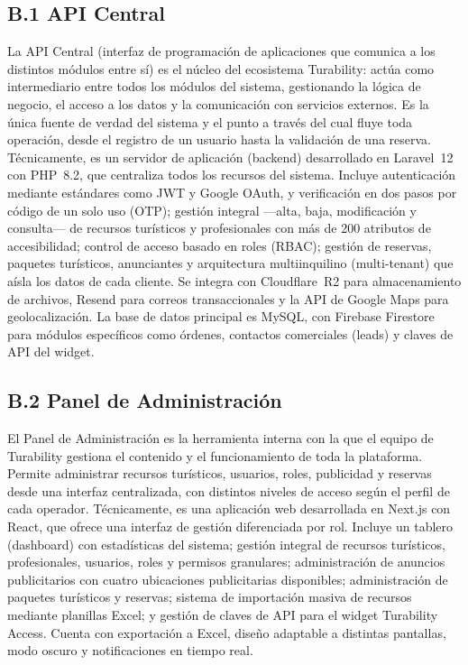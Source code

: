 \documentclass[12pt,a4paper]{article}
\begin{document}
\subsection*{B.1 API Central}

La API Central (interfaz de programación de aplicaciones que comunica a los distintos módulos entre sí) es el núcleo del ecosistema Turability: actúa como intermediario entre todos los módulos del sistema, gestionando la lógica de negocio, el acceso a los datos y la comunicación con servicios externos. Es la única fuente de verdad del sistema y el punto a través del cual fluye toda operación, desde el registro de un usuario hasta la validación de una reserva. Técnicamente, es un servidor de aplicación (backend) desarrollado en Laravel~12 con PHP~8.2, que centraliza todos los recursos del
sistema. Incluye autenticación mediante estándares como JWT y Google OAuth, y verificación en dos pasos por código de un solo uso (OTP);
gestión integral —alta, baja, modificación y consulta— de recursos turísticos y profesionales con más de 200 atributos de accesibilidad;
control de acceso basado en roles (RBAC); gestión de reservas, paquetes
turísticos, anunciantes y arquitectura multiinquilino (multi-tenant) que aísla los datos de cada cliente. Se integra con Cloudflare~R2 para almacenamiento
de archivos, Resend para correos transaccionales y la API de Google Maps para geolocalización.
La base de datos principal es MySQL, con Firebase Firestore para módulos específicos como
órdenes, contactos comerciales (leads) y claves de API del widget.

\subsection*{B.2 Panel de Administración}

El Panel de Administración es la herramienta interna con la que el equipo de Turability gestiona el contenido y el funcionamiento de toda la plataforma. Permite administrar recursos turísticos, usuarios, roles, publicidad y reservas desde una interfaz centralizada, con distintos niveles de acceso según el perfil de cada operador. Técnicamente, es una aplicación web desarrollada en Next.js con React, que ofrece una interfaz de gestión diferenciada por rol. Incluye un tablero (dashboard) con estadísticas del sistema; gestión integral de
recursos turísticos, profesionales, usuarios, roles y permisos granulares; administración de anuncios
publicitarios con cuatro ubicaciones publicitarias disponibles; administración de paquetes turísticos y reservas;
sistema de importación masiva de recursos mediante planillas Excel; y gestión de claves de API para el widget
Turability Access. Cuenta con exportación a Excel, diseño adaptable a distintas pantallas, modo oscuro y notificaciones en tiempo
real.
\end{document}
